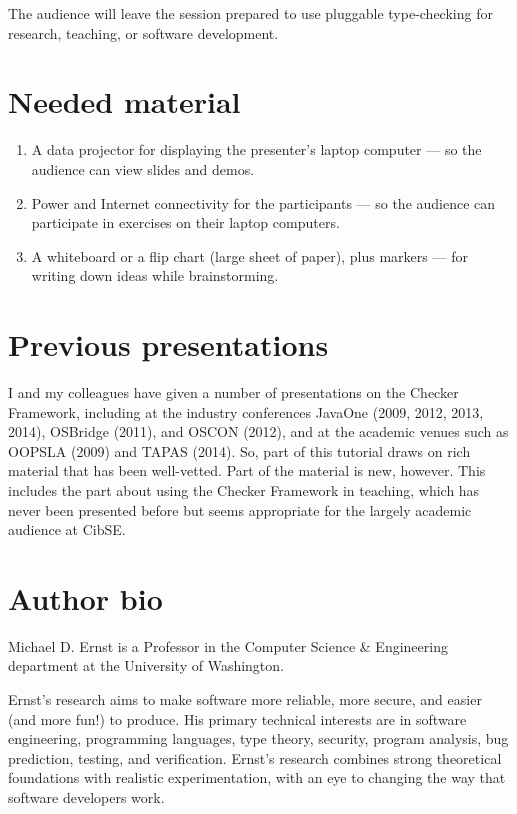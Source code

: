 \documentclass{llncs} %
\begin{document}
The audience will leave the session prepared to use pluggable type-checking
for research, teaching, or software development.


\section{Needed material}


\begin{enumerate}
\item
A data projector for displaying the presenter's laptop computer --- so the
audience can view slides and demos.
\item
Power and Internet connectivity for the participants --- so the audience
can participate in exercises on their laptop computers.
\item
A whiteboard or a flip chart (large sheet of paper), plus markers --- for
writing down ideas while brainstorming.
\end{enumerate}


\section{Previous presentations}

I and my colleagues have given a number of presentations on the Checker
Framework, including at the industry conferences JavaOne (2009, 2012, 2013,
2014), OSBridge (2011), and OSCON (2012), and at the academic venues such
as OOPSLA (2009) and TAPAS (2014).  So, part of this tutorial draws on rich
material that has been well-vetted.  Part of the material is new, however.
This includes the part about using the Checker Framework in teaching, which
has never been presented before but seems appropriate for the largely
academic audience at CibSE\@.


\section{Author bio}

Michael D. Ernst is a Professor in the Computer Science \& Engineering
department at the University of Washington.

Ernst's research aims to make software more reliable, more secure, and
easier (and more fun!) to produce. His primary technical interests are in
software engineering, programming languages, type theory, security, program
analysis, bug prediction, testing, and verification. Ernst's research
combines strong theoretical foundations with realistic experimentation,
with an eye to changing the way that software developers work.
\end{document}
